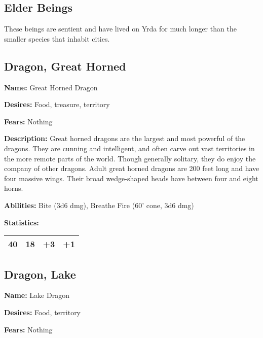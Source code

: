 \begin{multicols}{2}
\section{Elder Beings}

These beings are sentient and have lived on Yrda for much
longer than the smaller species that inhabit cities.

\subsection{Dragon, Great Horned}

\textbf{Name:} Great Horned Dragon

\textbf{Desires:} Food, treasure, territory

\textbf{Fears:} Nothing

\textbf{Description:} Great horned dragons are the largest and most powerful of the
dragons. They are cunning and intelligent, and often carve out vast territories in the
more remote parts of the world. Though generally solitary, they do enjoy the company of
other dragons. Adult great horned dragons are 200 feet long and have four massive wings.
Their broad wedge-shaped heads have between four and eight horns.

\textbf{Abilities:} Bite (3d6 dmg), Breathe Fire (60' cone, 3d6 dmg)

\textbf{Statistics:}

\begin{center}
{
\begin{xtabular}{|l|l|l|l|}
40 & 18 & +3 & +1 \\
\hline
\end{xtabular}
}
\end{center}

\subsection{Dragon, Lake}

\textbf{Name:} Lake Dragon

\textbf{Desires:} Food, territory

\textbf{Fears:} Nothing


\end{multicols}
